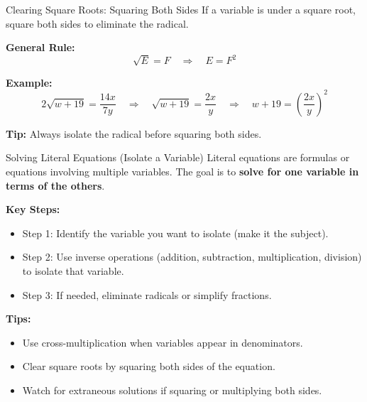\documentclass{beamer}
\begin{document}
\begin{frame}{Clearing Square Roots: Squaring Both Sides}
\small
If a variable is under a square root, square both sides to eliminate the radical.

\textbf{General Rule:}
\[
\sqrt{E} = F \quad \Rightarrow \quad E = F^2
\]

\vspace{0.3cm}
\textbf{Example:}
\[
2\sqrt{w + 19} = \frac{14x}{7y}
\quad \Rightarrow \quad
\sqrt{w + 19} = \frac{2x}{y}
\quad \Rightarrow \quad
w + 19 = \left( \frac{2x}{y} \right)^2
\]

\vspace{0.3cm}
\textbf{Tip:} Always isolate the radical before squaring both sides.
\end{frame}



\begin{frame}{Solving Literal Equations (Isolate a Variable)}
\small
Literal equations are formulas or equations involving multiple variables. The goal is to \textbf{solve for one variable in terms of the others}.

\vspace{0.2cm}
\textbf{Key Steps:}
\begin{itemize}
    \item Step 1: Identify the variable you want to isolate (make it the subject).
    \item Step 2: Use inverse operations (addition, subtraction, multiplication, division) to isolate that variable.
    \item Step 3: If needed, eliminate radicals or simplify fractions.
\end{itemize}



\vspace{0.3cm}
\textbf{Tips:}
\begin{itemize}
    \item Use cross-multiplication when variables appear in denominators.
    \item Clear square roots by squaring both sides of the equation.
    \item Watch for extraneous solutions if squaring or multiplying both sides.
\end{itemize}
\end{frame}
\end{document}
